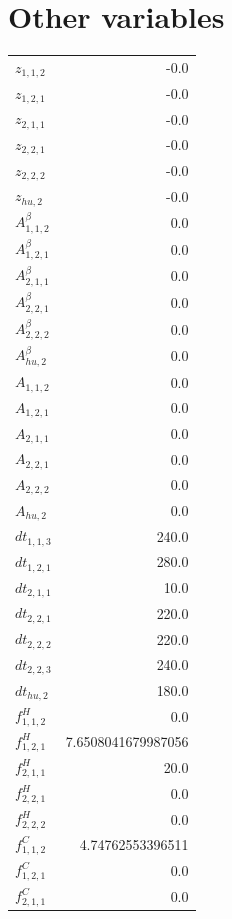 \documentclass{article}%
\makeatletter
\let\mcnewpage=\newpage%
\newcommand{\TrickSupertabularIntoMulticols}{%
\renewcommand\newpage{%
\if@firstcolumn%
\hrule width\linewidth height0pt%
\columnbreak%
\else%
\mcnewpage%
\fi%
}%
}%
\makeatother
\begin{document}
\section{Other variables}%
\thispagestyle{plain}%
\begin{multicols*}{3}%
\TrickSupertabularIntoMulticols%
%
\begin{supertabular}{lr}%
	$z_{1,1,2}$ & -0.0 \\%
	$z_{1,2,1}$ & -0.0 \\%
	$z_{2,1,1}$ & -0.0 \\%
	$z_{2,2,1}$ & -0.0 \\%
	$z_{2,2,2}$ & -0.0 \\%
	$z_{hu,2}$ & -0.0 \\%
	$A_{1,1,2}^{\beta}$ & 0.0 \\%
	$A_{1,2,1}^{\beta}$ & 0.0 \\%
	$A_{2,1,1}^{\beta}$ & 0.0 \\%
	$A_{2,2,1}^{\beta}$ & 0.0 \\%
	$A_{2,2,2}^{\beta}$ & 0.0 \\%
	$A_{hu,2}^{\beta}$ & 0.0 \\%
	$A_{1,1,2}$ & 0.0 \\%
	$A_{1,2,1}$ & 0.0 \\%
	$A_{2,1,1}$ & 0.0 \\%
	$A_{2,2,1}$ & 0.0 \\%
	$A_{2,2,2}$ & 0.0 \\%
	$A_{hu,2}$ & 0.0 \\%
	$dt_{1,1,3}$ & 240.0 \\%
	$dt_{1,2,1}$ & 280.0 \\%
	$dt_{2,1,1}$ & 10.0 \\%
	$dt_{2,2,1}$ & 220.0 \\%
	$dt_{2,2,2}$ & 220.0 \\%
	$dt_{2,2,3}$ & 240.0 \\%
	$dt_{hu,2}$ & 180.0 \\%
	$f_{1,1,2}^{H}$ & 0.0 \\%
	$f_{1,2,1}^{H}$ & 7.6508041679987056 \\%
	$f_{2,1,1}^{H}$ & 20.0 \\%
	$f_{2,2,1}^{H}$ & 0.0 \\%
	$f_{2,2,2}^{H}$ & 0.0 \\%
	$f_{1,1,2}^{C}$ & 4.74762553396511 \\%
	$f_{1,2,1}^{C}$ & 0.0 \\%
	$f_{2,1,1}^{C}$ & 0.0 \\%

\end{supertabular}
\end{multicols*}
\end{document}
